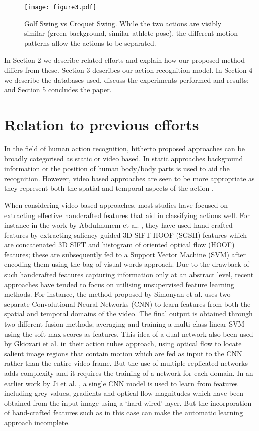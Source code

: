 \documentclass[10pt,twocolumn,letterpaper]{article}
\begin{document}
	\begin{figure}[h]
        \centering
        	\texttt{[image: figure3.pdf]}
	\caption{Golf Swing vs Croquet Swing. While the two actions are visibly similar (green background, similar athlete pose), the different motion patterns allow the actions to be separated.}
	\label{fig:fig3}
       
        \end{figure}
 	\vspace{-2 mm}
  In Section 2 we describe related efforts and explain how our proposed method differs from these. Section 3 describes our  action recognition model.  In Section 4 we describe the databases used, discuss the experiments performed and results; and Section 5 concludes the paper. 


\section{Relation to previous efforts}    

In the field of human action recognition, hitherto proposed approaches can be broadly categorised as static or video based. In static approaches background information or the position of human body/body parts \cite{Delaitre2010,Raja2011} is used to aid the recognition. However, video based approaches are seen to be more appropriate as they represent both the spatial and temporal aspects of the action \cite{Simonyan2014}. 


	When considering video based approaches, most studies have focused on extracting effective handcrafted features that aid in classifying actions well. For instance in the work by Abdulmunem et al. \cite{Abdulmunem2016}, they have used hand crafted features by extracting saliency guided 3D-SIFT-HOOF (SGSH) features which are concatenated 3D SIFT and histogram of oriented optical flow (HOOF) features; these are subsequently fed to a Support Vector Machine (SVM) after encoding them using the bag of visual words approach. Due to the drawback of such handcrafted features capturing information only at an abstract level, recent approaches have tended to focus on utilising unsupervised feature learning methods. For instance, the method proposed by Simonyan et al. \cite{Simonyan2014} uses two separate Convolutional Neural Networks (CNN) to learn features from both the spatial and temporal domains of the video. The final output is obtained through two different fusion methods; averaging and training a multi-class linear SVM using the soft-max scores as features. This idea of a dual network also been used by Gkioxari et al. \cite{actiontubes}  in their action tubes approach, using optical flow to locate salient image regions that contain motion which are fed as input to the CNN rather than the entire video frame. But the use of multiple replicated networks adds complexity and it requires the training of a network for each domain. In an earlier work by Ji et al. \cite{Ji2013}, a single CNN model is used to learn from features including grey values, gradients and optical flow magnitudes which have been obtained from the input image using a `hard wired' layer. But the incorporation of hand-crafted features such as in this case can make the automatic learning approach incomplete.  
	
\end{document}
